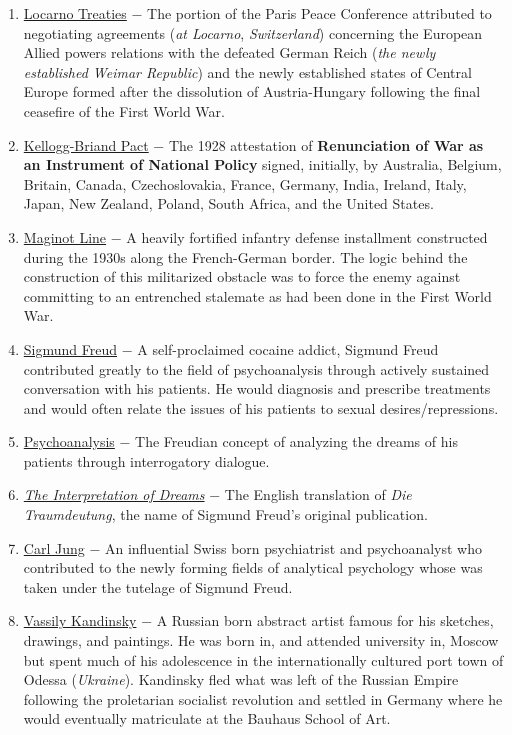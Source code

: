 \documentclass[12pt]{article}
\begin{document}
\begin{flushleft}
\begin{enumerate}
\item \underline{Locarno Treaties} $-$ The portion of the Paris Peace Conference attributed to negotiating agreements (\emph{at Locarno}, \emph{Switzerland}) concerning the European Allied powers relations with the defeated German Reich (\emph{the newly established Weimar Republic}) and the newly established states of Central Europe formed after the dissolution of Austria-Hungary following the final ceasefire of the First World War.

\item \underline{Kellogg-Briand Pact} $-$ The 1928 attestation of \textbf{Renunciation of War as an Instrument of National Policy} signed, initially, by Australia, Belgium, Britain, Canada, Czechoslovakia, France, Germany, India, Ireland, Italy, Japan, New Zealand, Poland, South Africa, and the United States.

\item \underline{Maginot Line} $-$ A heavily fortified infantry defense installment constructed during the 1930s along the French-German border. The logic behind the construction of this militarized obstacle was to force the enemy against committing to an entrenched stalemate as had been done in the First World War.

\item \underline{Sigmund Freud} $-$ A self-proclaimed cocaine addict, Sigmund Freud contributed greatly to the field of psychoanalysis through actively sustained conversation with his patients. He would diagnosis and prescribe treatments and would often relate the issues of his patients to sexual desires/repressions.

\item \underline{Psychoanalysis} $-$ The Freudian concept of analyzing the dreams of his patients through interrogatory dialogue.

\item \underline{\emph{The Interpretation of Dreams}} $-$ The English translation of \emph{Die Traumdeutung}, the name of Sigmund Freud's original publication. 

\item \underline{Carl Jung} $-$ An influential Swiss born  psychiatrist and psychoanalyst who contributed to the newly forming fields of analytical psychology whose was taken under the tutelage of Sigmund Freud.

\item \underline{Vassily Kandinsky} $-$ A Russian born abstract artist famous for his sketches, drawings, and paintings. He was born in, and attended university in, Moscow but spent much of his adolescence in the internationally cultured port town of Odessa (\emph{Ukraine}). Kandinsky fled what was left of the Russian Empire following the proletarian socialist revolution and settled in Germany where he would eventually matriculate at the Bauhaus School of Art.


\end{enumerate}
\end{flushleft}
\end{document}
